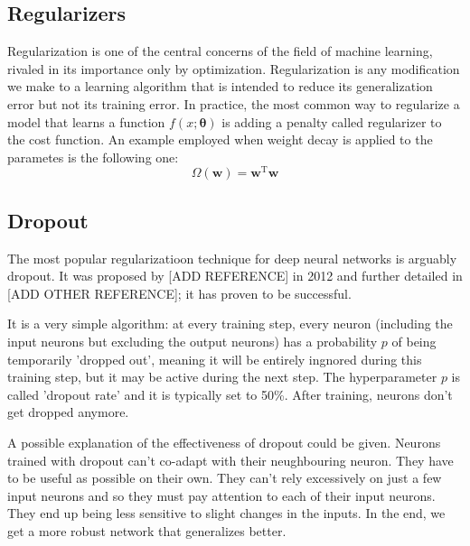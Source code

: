 \subsection{Regularizers}
Regularization is one of the central concerns of the field of machine learning, rivaled in its importance only by optimization. Regularization is any modification we make to a learning algorithm that is intended to reduce its generalization error but not its training error\footnotemark. In practice, the most common way to regularize a model that learns a function $f(x;\bm{\theta})$ is adding a penalty called regularizer to the cost function. An example employed when weight decay is applied to the parametes is the following one:
\begin{equation}
    \Omega(\mathbf{w}) = \mathbf{w}^\mathrm{T} \mathbf{w}
\end{equation}



\subsection{Dropout}
The most popular regularizatioon technique for deep neural networks is arguably dropout. It was proposed by [ADD REFERENCE] in 2012 and further detailed in [ADD OTHER REFERENCE]; it has proven to be successful.

It is a very simple algorithm: at every training step, every neuron (including the input neurons but excluding the output neurons) has a probability $p$ of being temporarily 'dropped out', meaning it will be entirely ingnored during this training step, but it may be active during the next step. The hyperparameter $p$ is called 'dropout rate' and it is typically set to 50\%. After training, neurons don't get dropped anymore.

\begin{figure}[H]
	\centering
	
	\label{fig:DROPOUT}
\end{figure}

A possible explanation of the effectiveness of dropout could be given. Neurons trained with dropout can't co-adapt with their neughbouring neuron. They have to be useful as possible on their own. They can't rely excessively on just a few input neurons and so they must pay attention to each of their input neurons. They end up being less sensitive to slight changes in the inputs. In the end, we get a more robust network that generalizes better.



